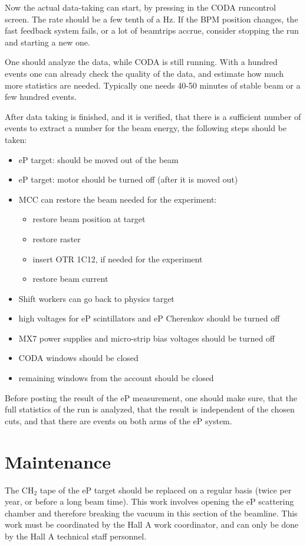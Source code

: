 {Now the actual data-taking can start, by pressing 
in the CODA runcontrol screen. The rate should be a few 
tenth of a Hz. If the BPM position changes, the fast feedback system fails, or a 
lot of beamtrips accrue, consider stopping the run and starting a new 
one.

One should analyze the data, while CODA is still running. 
With a hundred events one can already check the quality of the 
data, and estimate how much more statistics are needed.
Typically one needs 40-50 minutes of stable beam or a few 
hundred events.

After data taking is finished, and it is verified, that there
is a sufficient number of events to extract a number for the beam energy, 
the following steps should be taken:
\begin{itemize}
\item eP target: should be moved out of the beam
\item eP target: motor should be turned off (after it is moved out)
\item MCC can restore the beam needed for the experiment: 
\begin{itemize}
\item restore beam position at target
\item restore raster
\item insert OTR 1C12, if needed for the experiment
\item restore beam current
\end{itemize}
\item Shift workers can go back to physics target
\item high voltages for eP scintillators and eP Cherenkov should be turned off
\item MX7 power supplies and micro-strip bias voltages should be turned off
\item CODA windows should be closed
\item remaining windows from the  account should be closed
\end{itemize}
Before posting the result of the eP measurement, one should make sure,
that the full statistics of the run is analyzed, that the result is 
independent of the chosen cuts, and that there are events on both 
arms of the eP system.

\section{Maintenance}
\label{sec:ep_maintenance}

The CH$_2$ tape of the eP target 
should be replaced on a regular basis (twice per year, or 
before a long beam time). This work involves opening the 
eP scattering chamber and therefore breaking the vacuum in
this section of the beamline. This work must be coordinated
by the Hall A work coordinator, and can only be done by the 
Hall A technical staff personnel. 
}

